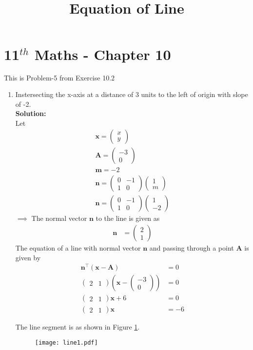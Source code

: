 \documentclass[journal,10pt,twocolumn]{article}
\providecommand{\brak}[1]{\ensuremath{\left(#1\right)}}
\newcommand{\solution}{\noindent \textbf{Solution: }}
\newcommand{\myvec}[1]{\ensuremath{\begin{pmatrix}#1\end{pmatrix}}}
\let\vec\mathbf
\begin{document}
\begin{center}
\title{\textbf{Equation  of Line}}
\date{\vspace{-5ex}} %
\maketitle
\end{center}
\setcounter{page}{1}

\section{11$^{th}$ Maths - Chapter 10}
This is Problem-5 from Exercise 10.2
\begin{enumerate}
\item Instersecting the x-axis at a distance of 3 units to the left of origin with slope of -2.
\\
\solution 
\\
Let 
\begin{align}
\vec{x}=\myvec{x\\y}\\
\vec{A}=\myvec{-3\\0}\\
\vec{m}=-2\\
\vec{n}=\myvec{0&-1\\1&0}\myvec{1\\m}\\ 
\vec{n}=\myvec{0&-1\\1&0}\myvec{1\\-2}
\end{align}
$\implies$ The normal vector $\vec{n}$ to the line is given as
\begin{align}
\vec{n} &=  \myvec{2 \\1} 
\end{align}
The equation of a line with normal vector $\vec{n}$ and passing through a point $\vec{A}$ is given by
\begin{align}
	\vec{n}^\top\brak{\vec{x}-\vec{A}} &= 0 \\
	\myvec { 2 & 1 } \brak{ \vec{x} - \myvec{ -3 \\ 0}} &= 0  \\
	\myvec{ 2 & 1} \vec{x} +6 &= 0 \\
        \label{eq:1}
	\myvec{ 2 & 1} \vec{x}  &= -6
\end{align}

 The line segment is as shown in Figure \ref{fig:Fig1}.
\begin{figure}[!h]
	\begin{center}
		\texttt{[image: line1.pdf]}
	\end{center}
\caption{}
\label{fig:Fig1}
\end{figure}

\end{enumerate}
\end{document}
